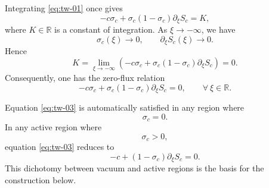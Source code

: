 \documentclass[12pt]{article}
\theoremstyle{definition}
\theoremstyle{remark}
\numberwithin{equation}{section}
\begin{document}
Integrating \eqref{eq:tw-01} once gives
\[
-c\sigma_c+\sigma_c(1-\sigma_c)\partial_\xi S_c=K,
\]
where \(K \in \mathbb R\) is a constant of integration. As \(\xi\to-\infty\), we have
\[
\sigma_c(\xi)\to0,
\qquad
\partial_\xi S_c(\xi)\to0.
\]
Hence
\[
K
=
\lim_{\xi\to-\infty}
\left(
-c\sigma_c+\sigma_c(1-\sigma_c)\partial_\xi S_c
\right)
=
0.
\]
Consequently, one has the zero-flux relation
\begin{equation}
-c\sigma_c+\sigma_c(1-\sigma_c)\partial_\xi S_c=0, \qquad \forall \ \xi \in \mathbb R. 
\label{eq:tw-03}
\end{equation}


\smallskip 


Equation \eqref{eq:tw-03} is automatically satisfied in any region where
\[
\sigma_c=0.
\]
In any active region where
\[
\sigma_c>0,
\]
equation \eqref{eq:tw-03} reduces to
\[
-c+(1-\sigma_c)\partial_\xi S_c=0.
\]
This dichotomy between vacuum and active regions is the basis for the
construction below.
\end{document}
